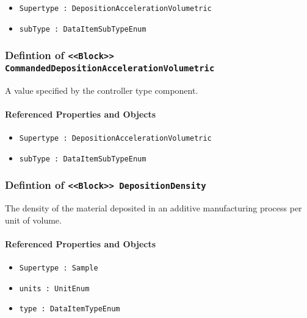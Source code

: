 \begin{itemize}
\item \texttt{Supertype : DepositionAccelerationVolumetric}

\item \texttt{subType : DataItemSubTypeEnum}

\end{itemize}
\FloatBarrier
\subsubsection{Defintion of \texttt{<<Block>> CommandedDepositionAccelerationVolumetric}}
  \label{type:CommandedDepositionAccelerationVolumetric}

\FloatBarrier

A value specified by the controller type component.

\FloatBarrier
\paragraph{Referenced Properties and Objects}

\begin{itemize}
\item \texttt{Supertype : DepositionAccelerationVolumetric}

\item \texttt{subType : DataItemSubTypeEnum}

\end{itemize}
\FloatBarrier
\subsubsection{Defintion of \texttt{<<Block>> DepositionDensity}}
  \label{type:DepositionDensity}

\FloatBarrier

The density of the material deposited in an additive manufacturing process per unit of volume.

\FloatBarrier
\paragraph{Referenced Properties and Objects}

\begin{itemize}
\item \texttt{Supertype : Sample}

\item \texttt{units : UnitEnum}

\item \texttt{type : DataItemTypeEnum}

\end{itemize}
\FloatBarrier
